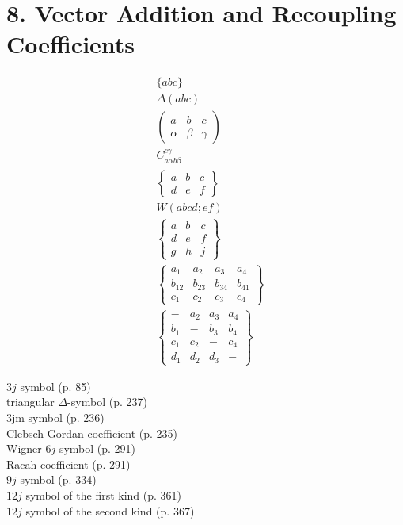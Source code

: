 \section*{8. Vector Addition and Recoupling Coefficients}
$$
\begin{aligned}
& \{a b c\} \\
& \Delta(a b c) \\
& \left(\begin{array}{lll}
a & b & c \\
\alpha & \beta & \gamma
\end{array}\right) \\
& C_{a \alpha b \beta}^{c \gamma} \\
& \left\{\begin{array}{lll}
a & b & c \\
d & e & f
\end{array}\right\} \\
& W(a b c d ; e f) \\
& \left\{\begin{array}{lll}
a & b & c \\
d & e & f \\
g & h & j
\end{array}\right\} \\
& \left\{\begin{array}{cccc}
a_{1} & a_{2} & a_{3} & a_{4} \\
b_{12} & b_{23} & b_{34} & b_{41} \\
c_{1} & c_{2} & c_{3} & c_{4}
\end{array}\right\} \\
& \left\{\begin{array}{llll}
- & a_{2} & a_{3} & a_{4} \\
b_{1} & - & b_{3} & b_{4} \\
c_{1} & c_{2} & - & c_{4} \\
d_{1} & d_{2} & d_{3} & -
\end{array}\right\}
\end{aligned}
$$

$3 j$ symbol (p. 85)\\
triangular $\Delta$-symbol (p. 237)\\
3jm symbol (p. 236)\\
Clebsch-Gordan coefficient (p. 235)\\
Wigner $6 j$ symbol (p. 291)\\
Racah coefficient (p. 291)\\
$9 j$ symbol (p. 334)\\
$12 j$ symbol of the first kind (p. 361)\\
$12 j$ symbol of the second kind (p. 367)

